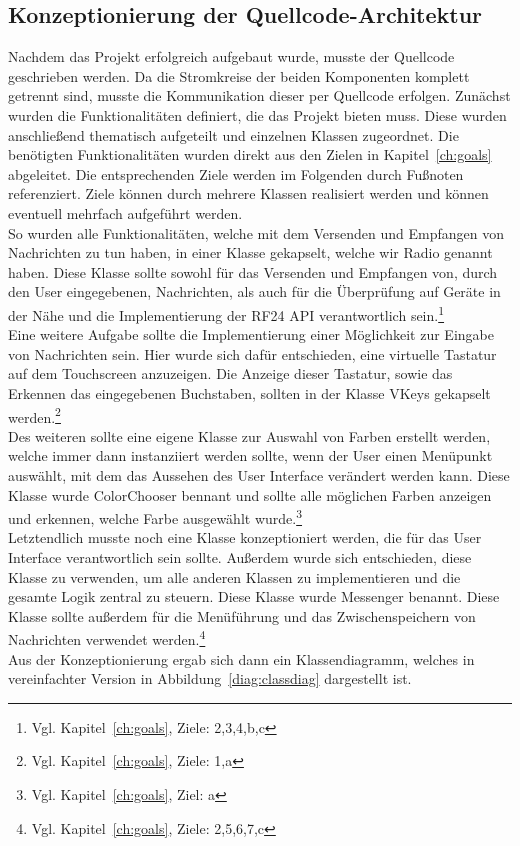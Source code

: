 \documentclass[a4paper, 11pt]{scrartcl}
\begin{document}
\subsection{Konzeptionierung der Quellcode-Architektur}
Nachdem das Projekt erfolgreich aufgebaut wurde, musste der Quellcode geschrieben werden. Da die Stromkreise der beiden Komponenten komplett getrennt sind,
musste die Kommunikation dieser per Quellcode erfolgen.
Zunächst wurden die Funktionalitäten definiert, die das Projekt bieten muss. Diese wurden anschließend thematisch aufgeteilt und einzelnen Klassen zugeordnet.
Die benötigten Funktionalitäten wurden direkt aus den Zielen in Kapitel~\ref{ch:goals} abgeleitet. Die entsprechenden Ziele werden im Folgenden durch Fußnoten
referenziert. Ziele können durch mehrere Klassen realisiert werden und können eventuell mehrfach aufgeführt werden.
\\
So wurden alle Funktionalitäten, welche mit dem Versenden und Empfangen von Nachrichten zu tun haben, in einer Klasse gekapselt, welche wir \glqq Radio\grqq{} genannt haben.
Diese Klasse sollte sowohl für das Versenden und Empfangen von, durch den User eingegebenen, Nachrichten, als auch für die Überprüfung auf Geräte in der Nähe und die
Implementierung der RF24 API verantwortlich sein.\footnote{Vgl. Kapitel~\ref{ch:goals}, Ziele: 2,3,4,b,c}
\\
Eine weitere Aufgabe sollte die Implementierung einer Möglichkeit zur Eingabe von Nachrichten sein. Hier wurde sich dafür entschieden, eine virtuelle Tastatur auf dem
Touchscreen anzuzeigen. Die Anzeige dieser Tastatur, sowie das Erkennen das eingegebenen Buchstaben, sollten in der Klasse \glqq VKeys\grqq{} gekapselt 
werden.\footnote{Vgl. Kapitel~\ref{ch:goals}, Ziele: 1,a}
\\
Des weiteren sollte eine eigene Klasse zur Auswahl von Farben erstellt werden, welche immer dann instanziiert werden sollte, wenn der User einen Menüpunkt auswählt,
mit dem das Aussehen des User Interface verändert werden kann. Diese Klasse wurde \glqq ColorChooser\grqq{} bennant und sollte alle möglichen Farben anzeigen 
und erkennen, welche Farbe ausgewählt wurde.\footnote{Vgl. Kapitel~\ref{ch:goals}, Ziel: a}
\\
Letztendlich musste noch eine Klasse konzeptioniert werden, die für das User Interface verantwortlich sein sollte. Außerdem wurde sich entschieden, diese Klasse
zu verwenden, um alle anderen Klassen zu implementieren und die gesamte Logik zentral zu steuern. Diese Klasse wurde \glqq Messenger\grqq{} benannt. Diese Klasse
sollte außerdem für die Menüführung und das Zwischenspeichern von Nachrichten verwendet werden.\footnote{Vgl. Kapitel~\ref{ch:goals}, Ziele: 2,5,6,7,c}
\\
Aus der Konzeptionierung ergab sich dann ein Klassendiagramm, welches in vereinfachter Version in Abbildung~\ref{diag:classdiag} dargestellt ist.
\end{document}

